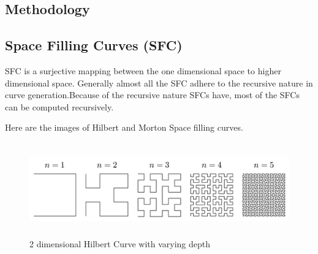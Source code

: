 \documentclass[a0,landscape]{a0poster}
\begin{document}
\begin{multicols}{4}
\color{DarkSlateGray} %
\section*{Methodology}

\subsection*{Space Filling Curves (SFC)}
SFC is a surjective mapping between the one dimensional space to higher dimensional space. Generally almost all the SFC adhere to the recursive nature in curve generation.Because of the recursive
nature SFCs have, most of the SFCs can be computed recursively.

Here are the images of Hilbert and Morton Space filling curves. 

\begin{figure}[H]
\centering
\includegraphics[height=40mm,keepaspectratio]{hilbertcurve.png}
\caption{ 2 dimensional Hilbert Curve with varying depth \label{hilbertcurve}}
\end{figure}


\end{multicols}
\end{document}
